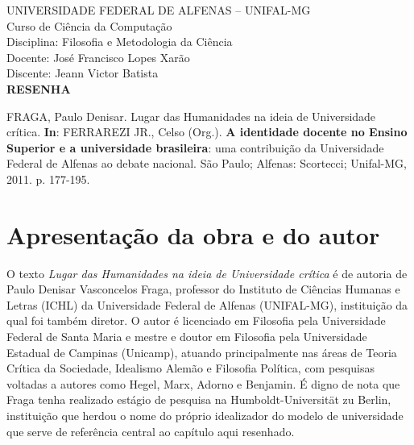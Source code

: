 \documentclass[12pt]{article}
\begin{document}
\begin{singlespace}
\begin{center}
UNIVERSIDADE FEDERAL DE ALFENAS -- UNIFAL-MG\\
Curso de Ciência da Computação\\
Disciplina: Filosofia e Metodologia da Ciência\\
Docente: José Francisco Lopes Xarão\\
Discente: Jeann Victor Batista\\[6mm]
{\bfseries\Large RESENHA}
\end{center}

\vspace{4mm}
\noindent
FRAGA, Paulo Denisar. Lugar das Humanidades na ideia de Universidade crítica.
\textbf{In}: FERRAREZI JR., Celso (Org.). \textbf{A identidade docente no
Ensino Superior e a universidade brasileira}: uma contribuição da
Universidade Federal de Alfenas ao debate nacional. São Paulo; Alfenas:
Scortecci; Unifal-MG, 2011. p. 177-195.
\end{singlespace}

\vspace{6mm}

\onehalfspacing

\section*{Apresentação da obra e do autor}

O texto \emph{Lugar das Humanidades na ideia de Universidade crítica} é de
autoria de Paulo Denisar Vasconcelos Fraga, professor do Instituto de
Ciências Humanas e Letras (ICHL) da Universidade Federal de Alfenas
(UNIFAL-MG), instituição da qual foi também diretor. O autor é licenciado em
Filosofia pela Universidade Federal de Santa Maria e mestre e doutor em
Filosofia pela Universidade Estadual de Campinas (Unicamp), atuando
principalmente nas áreas de Teoria Crítica da Sociedade, Idealismo Alemão e
Filosofia Política, com pesquisas voltadas a autores como Hegel, Marx,
Adorno e Benjamin. É digno de nota que Fraga tenha realizado estágio de
pesquisa na Humboldt-Universität zu Berlin, instituição que herdou o nome
do próprio idealizador do modelo de universidade que serve de referência
central ao capítulo aqui resenhado.
\end{document}
